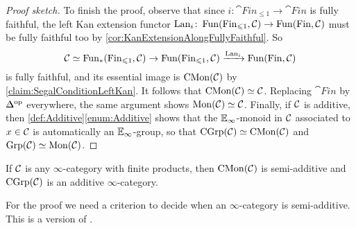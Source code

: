 \begin{proof}[Proof sketch]
	To finish the proof, observe that since $i\colon \cat{Fin}_{\leqslant 1}\rightarrow \cat{Fin}$ is fully faithful, the left Kan extension functor $\operatorname{Lan}_{i}\colon \operatorname{Fun}(\mathrm{Fin}_{\leqslant 1},\mathcal{C})\rightarrow \operatorname{Fun}(\mathrm{Fin},\mathcal{C})$ must be fully faithful too by \cref{cor:KanExtensionAlongFullyFaithful}. So
	\begin{equation*}
		\mathcal{C}\simeq \operatorname{Fun}_*\!\left(\mathrm{Fin}_{\leqslant 1},\mathcal{C}\right)\rightarrow \operatorname{Fun}\!\left(\mathrm{Fin}_{\leqslant 1},\mathcal{C}\right)\xrightarrow{\operatorname{Lan}_i}\operatorname{Fun}\!\left(\mathrm{Fin},\mathcal{C}\right)
	\end{equation*}
	is fully faithful, and its essential image is $\mathrm{CMon}(\mathcal{C})$ by \cref{claim:SegalConditionLeftKan}. It follows that $\mathrm{CMon}(\mathcal{C})\simeq \mathcal{C}$. Replacing $\cat{Fin}$ by $\IDelta^\op$ everywhere, the same argument shows $\mathrm{Mon}(\mathcal{C})\simeq \mathcal{C}$. Finally, if $\mathcal{C}$ is additive, then \cref{def:Additive}\cref{enum:Additive} shows that the $\mathbb{E}_\infty$-monoid in $\mathcal{C}$ associated to $x\in\mathcal{C}$ is automatically an $\mathbb{E}_\infty$-group, so that $\mathrm{CGrp}(\mathcal{C})\simeq \mathrm{CMon}(\mathcal{C})$ and $\mathrm{Grp}(\mathcal{C})\simeq \mathrm{Mon}(\mathcal{C})$.
\end{proof}
\begin{lem}\label{lem:CGrpAdditive}
	If $\mathcal{C}$ is any $\infty$-category with finite products, then $\mathrm{CMon}(\mathcal{C})$ is semi-additive and $\mathrm{CGrp}(\mathcal{C})$ is an additive $\infty$-category.
\end{lem}
For the proof we need a criterion to decide when an $\infty$-category is semi-additive. This is a version of \cite[Proposition~]{HA}.
